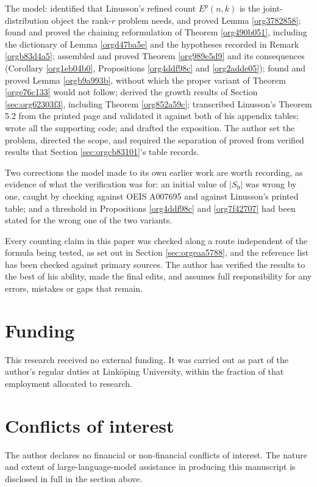 \documentclass[11pt, a4paper, abstract=yes]{scrartcl}
\theoremstyle{definition}
\theoremstyle{remark}
\theoremstyle{plain}
\begin{document}
The model: identified that Linusson's refined count \(E^p(n,k)\) is the joint-distribution object the
rank-\(r\) problem needs, and proved Lemma \ref{org3782858}; found and proved the chaining reformulation
of Theorem \ref{org490b051}, including the dictionary of Lemma \ref{orgd47ba5e} and the hypotheses
recorded in Remark \ref{orgb83d4a5}; assembled and proved Theorem \ref{org989e5d9} and its consequences
(Corollary \ref{org1eb04b0}, Propositions \ref{org4ddf98c} and \ref{org2adde05}); found and proved
Lemma \ref{orgb9a993b}, without which the proper variant of Theorem \ref{orge76c133} would not follow;
derived the growth results of Section \ref{sec:org62303f3}, including Theorem \ref{org852a59c}; transcribed
Linusson's Theorem 5.2 from the printed page and validated it against both of his appendix tables;
wrote all the supporting code; and drafted the exposition. The author set the problem, directed the
scope, and required the separation of proved from verified results that Section \ref{sec:orgcb83101}'s table
records.

Two corrections the model made to its own earlier work are worth recording, as evidence of what the
verification was for: an initial value of \(|S_9|\) was wrong by one, caught by checking against
OEIS A007695 and against Linusson's printed table; and a threshold in Propositions \ref{org4ddf98c}
and \ref{org7f42707} had been stated for the wrong one of the two variants.

Every counting claim in this paper was checked along a route independent of the formula being tested,
as set out in Section \ref{sec:orgeaa5788}, and the reference list has been checked against primary
sources. The author has verified the results to the best of his ability, made the final edits, and
assumes full responsibility for any errors, mistakes or gaps that remain.
\section*{Funding}
\label{sec:orga83c28e}
This research received no external funding. It was carried out as part of the author's regular duties
at Linköping University, within the fraction of that employment allocated to research.
\section*{Conflicts of interest}
\label{sec:org95a1c21}
The author declares no financial or non-financial conflicts of interest. The nature and extent of
large-language-model assistance in producing this manuscript is disclosed in full in the section
above.
\end{document}
